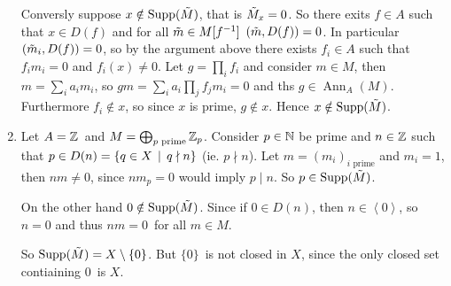 \documentclass[a4paper,11pt,english]{article}
\DeclareMathOperator{\Ann}{Ann}
\DeclareMathOperator{\Supp}{Supp}
\begin{document}
\begin{exercise}[3]
\begin{enumerate}
Conversly suppose $x \notin \Supp(\tM)$, that is $\tilde{M}_x = 0$. So there exits $f
\in A$ such that $x \in D(f)$ and for all $\tilde{m} \in M[f^{-1}]$ $(\tilde{m}, D(f)) =
0$. In particular $(\tilde{m}_i, D(f)) = 0$, so by the argument above there exists
$f_i \in A$ such that $f_i m_i = 0$ and $f_i(x) \ne 0$. 
Let $g = \prod_i f_i$ and consider $m \in M$, then $m = \sum_i a_i m_i$, so
$gm = \sum_i a_i \prod_j f_j m_i = 0$ and ths $g \in \Ann_A(M)$. 
Furthermore $f_i \notin x$, so since $x$ is prime, $g \notin x$. Hence 
$x \notin \Supp(\tM)$.

\item %
Let $A = \mathbb{Z}$ and $M = \bigoplus_{p \text{ prime}} \mathbb{Z}_p$. Consider $p \in \mathbb{N}$ be prime
and $n \in \mathbb{Z}$ such that $p \in D(n) = \{ q\in X \:\:|\:\: q \nmid n \}$ (ie. $p \nmid
n$). Let $m = (m_i)_{i \text{ prime}}$ and $m_i = 1$, then $nm \ne 0$, since
$n m_p = 0$ would imply $p \mid n$. So $p \in \Supp(\tM)$. 

On the other hand $0 \notin \Supp(\tM)$. Since if $0 \in D(n)$, then $n \in
\left<0\right>$, so $n = 0$ and thus $nm = 0$ for all $m\in M$.

So $\Supp(\tM) = X \setminus \{0\}$. But $\{0\}$ is not closed in $X$, since the
only closed set contiaining $0$ is $X$.
\end{enumerate}
\end{exercise}
\end{document}
